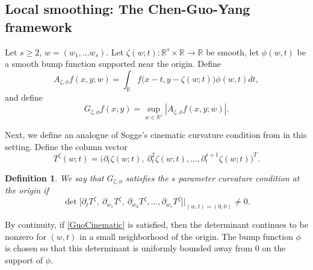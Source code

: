 \documentclass[letterpaper, reqno,11pt]{article}
\numberwithin{equation}{section}
\newcommand{\RR}{\mathbb{R}}
\numberwithin{thm}{section}
\newtheorem{defn}[thm]{Definition}
\theoremstyle{remark}
\begin{document}
\subsection{Local smoothing: The Chen-Guo-Yang framework}
Let $s\geq 2$, $w = (w_1,\ldots w_s)$. Let $\zeta(w;t)\colon \RR^{s}\times\RR \to\RR$ be smooth, let $\phi(w, t)$ be a smooth bump function supported near the origin. Define
\begin{equation}\label{GuoA}
A_{\zeta,\phi}f(x,y; w)=\int_{\RR}f\big(x-t, y - \zeta(w; t)\big)\phi(w, t)dt,
\end{equation}
and define 
\begin{equation}\label{GuoM}
G_{\zeta,\phi}f(x,y) = \sup_{w\in\RR^{s}}| A_{\zeta,\phi}f(x,y;w) |.
\end{equation}

Next, we define an analogue of Sogge's cinematic curvature condition from \cite{Sogge} in this setting.  Define the column vector
\[
T^\zeta(w;t) = \big(\partial_{t}\zeta(w; t),\ \partial^2_{t}\zeta(w;t),\ldots,\partial^{s+1}_{t}\zeta(w;t)\big)^T.
\]
\begin{defn}\label{sParamCinematicCondition}
We say that $G_{\zeta,\phi}$ satisfies the \emph{$s$ parameter curvature condition} at the origin if
\begin{equation}\label{GuoCinematic}
\det\big[\partial_{t}T^\zeta,\  \partial_{w_1}T^\zeta,\  \partial_{w_2}T^\zeta, \ldots, \partial_{w_{s}}T^\zeta\big]\Big|_{(w,t)=(0,0)}\neq 0.
\end{equation}
\end{defn}
By continuity, if \eqref{GuoCinematic} is satisfied, then the determinant continues to be nonzero for $(w,t)$ in a small neighborhood of the origin. The bump function $\phi$ is chosen so that this determinant is uniformly bounded away from $0$ on the support of $\phi$. 
\end{document}
